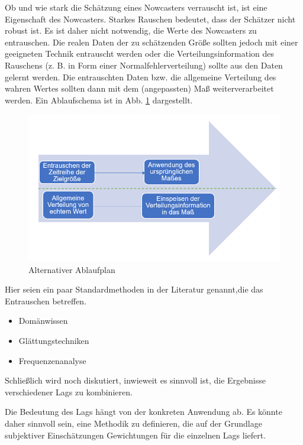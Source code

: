 \documentclass{article}
\theoremstyle{plain}%
\theoremstyle{definition}
\begin{document}
Ob und wie stark die Schätzung eines Nowcasters verrauscht ist, ist eine Eigenschaft des Nowcasters. Starkes Rauschen bedeutet, dass der Schätzer nicht robust ist. Es ist daher nicht notwendig, die Werte des Nowcasters zu entrauschen. Die realen Daten der zu schätzenden Größe sollten jedoch mit einer geeigneten Technik entrauscht werden oder die Verteilungsinformation des Rauschens (z. B. in Form einer Normalfehlerverteilung) sollte aus den Daten gelernt werden. Die entrauschten Daten bzw. die allgemeine Verteilung des wahren Wertes sollten dann mit dem (angepassten) Maß weiterverarbeitet werden. Ein Ablaufschema ist in Abb. \ref{fig:ablauf} dargestellt.

\begin{figure}
    \centering
    \includegraphics[width=1\linewidth]{plots/ablauf.png}
    \caption{Alternativer Ablaufplan}
    \label{fig:ablauf}
\end{figure}

Hier seien ein paar Standardmethoden in der Literatur genannt,die das Entrauschen betreffen. 

\begin{itemize}
    \item Domänwissen
    \item Glättungstechniken
    \item Frequenzenanalyse
\end{itemize}

Schließlich wird noch diskutiert, inwieweit es sinnvoll ist, die Ergebnisse verschiedener Lags zu kombinieren.

Die Bedeutung des Lags hängt von der konkreten Anwendung ab. Es könnte daher sinnvoll sein, eine Methodik zu definieren, die auf der Grundlage subjektiver Einschätzungen Gewichtungen für die einzelnen Lags liefert.
\end{document}
